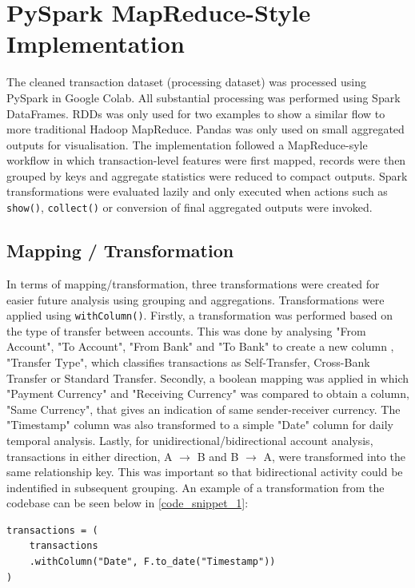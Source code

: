 \section{PySpark MapReduce-Style Implementation}

The cleaned transaction dataset (processing dataset) was processed using PySpark in Google Colab. All substantial processing was performed using Spark DataFrames. RDDs was only used for two examples to show a similar flow to more traditional Hadoop MapReduce. Pandas was only used on small aggregated outputs for visualisation. The implementation followed a MapReduce-syle workflow in which transaction-level features were first mapped, records were then grouped by keys and aggregate statistics were reduced to compact outputs. Spark transformations were evaluated lazily and only executed when actions such as \texttt{show()}, \texttt{collect()} or conversion of final aggregated outputs were invoked.

\subsection{Mapping / Transformation}

In terms of mapping/transformation, three transformations were created for easier future analysis using grouping and aggregations. Transformations were applied using \texttt{withColumn()}. Firstly, a transformation was performed based on the type of transfer between accounts. This was done by analysing "From Account", "To Account", "From Bank" and "To Bank" to create a new column , "Transfer Type", which classifies transactions as Self-Transfer, Cross-Bank Transfer or Standard Transfer. Secondly, a boolean mapping was applied in which "Payment Currency" and "Receiving Currency" was compared to obtain a column, "Same Currency", that gives an indication of same sender-receiver currency. The "Timestamp" column was also transformed to a simple "Date" column for daily temporal analysis. Lastly, for unidirectional/bidirectional account analysis, transactions in either direction, A $\rightarrow$ B and B $\rightarrow$ A, were transformed into the same relationship key. This was important so that bidirectional activity could be indentified in subsequent grouping. An example of a transformation from the codebase can be seen below in \autoref{code_snippet_1}:

\begin{lstlisting}[caption={PySpark Date Transformation}, label={code_snippet_1}]
transactions = (
    transactions
    .withColumn("Date", F.to_date("Timestamp"))
)
\end{lstlisting}

